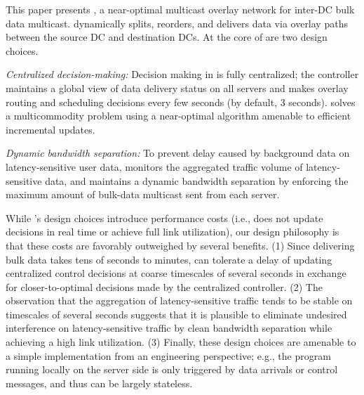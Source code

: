 This paper presents {\em \name}, a near-optimal multicast 
overlay network for inter-DC bulk data multicast.
\name dynamically splits, reorders, and delivers data via 
overlay paths between the source DC and destination DCs.
At the core of \name are two design choices.
\begin{packeditemize} 
\item {\em Centralized decision-making:} 
Decision making in \name is fully centralized; the \name 
controller maintains a global view of data delivery status on 
all servers 
and makes overlay routing and scheduling decisions every 
few seconds (by default, 3 seconds).
\name solves a multicommodity problem using 
a near-optimal algorithm amenable to efficient incremental 
updates.
\item {\em Dynamic bandwidth separation:}
To prevent delay caused by background data on 
latency-sensitive user data, \name monitors the 
aggregated traffic volume 
of latency-sensitive data, and maintains a dynamic bandwidth 
separation by enforcing the maximum amount of bulk-data 
multicast sent from each server. 
\end{packeditemize}

While \name's design choices introduce performance costs (i.e.,
\name does not update decisions in real time or achieve full 
link utilization), our design philosophy is that these costs are 
favorably outweighed by several benefits.
(1) Since delivering bulk data takes tens of seconds to 
minutes, \name can tolerate a delay of updating centralized 
control decisions at coarse timescales of several 
seconds in exchange for closer-to-optimal decisions made by  
the centralized controller.
(2) The observation that the aggregation of 
latency-sensitive traffic tends to 
be stable on timescales of several seconds suggests that it is 
plausible to eliminate undesired interference on 
latency-sensitive traffic by clean bandwidth separation 
while achieving a high link utilization.
(3) Finally, these design choices are amenable to a simple
implementation from an engineering perspective;
e.g., the program running locally on the server side is 
only triggered by data arrivals or control messages, and 
thus can be largely stateless.


